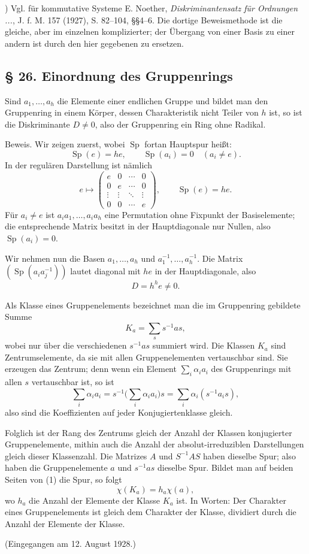 \documentclass[11pt]{article}
\begin{document}
{\footnotesize{}) Vgl. für kommutative Systeme E. Noether, \emph{Diskriminantensatz für Ordnungen ...}, J. f. M. 157 (1927), S. 82--104, §§4--6. Die dortige Beweismethode ist die gleiche, aber im einzelnen komplizierter; der Übergang von einer Basis zu einer andern ist durch den hier gegebenen zu ersetzen.\par}

\subsection*{§ 26. Einordnung des Gruppenrings}
Sind $a_1,\ldots,a_h$ die Elemente einer endlichen Gruppe und bildet man den Gruppenring in einem Körper, dessen Charakteristik nicht Teiler von $h$ ist, so ist die Diskriminante $D\ne0$, also der Gruppenring ein Ring ohne Radikal.

Beweis. Wir zeigen zuerst, wobei $\operatorname{Sp}$ fortan Hauptspur heißt:
\[
        \operatorname{Sp}(e)=he,
        \qquad
        \operatorname{Sp}(a_i)=0\quad(a_i\ne e).
\]
In der regulären Darstellung ist nämlich
\[
        e\mapsto\begin{pmatrix}e&0&\cdots&0\\0&e&\cdots&0\\\vdots&\vdots&\ddots&\vdots\\0&0&\cdots&e\end{pmatrix},
        \qquad \operatorname{Sp}(e)=he.
\]
Für $a_i\ne e$ ist $a_i a_1,\ldots,a_i a_h$ eine Permutation ohne Fixpunkt der Basiselemente; die entsprechende Matrix besitzt in der Hauptdiagonale nur Nullen, also $\operatorname{Sp}(a_i)=0$.

Wir nehmen nun die Basen $a_1,\ldots,a_h$ und $a_1^{-1},\ldots,a_h^{-1}$. Die Matrix $(\operatorname{Sp}(a_i a_j^{-1}))$ lautet diagonal mit $he$ in der Hauptdiagonale, also
\[
        D=h^h e\ne0.
\]

Als Klasse eines Gruppenelements bezeichnet man die im Gruppenring gebildete Summe
\[
        K_a=\sum_s s^{-1}as,                         \tag{1}
\]
wobei nur über die verschiedenen $s^{-1}as$ summiert wird. Die Klassen $K_a$ sind Zentrumselemente, da sie mit allen Gruppenelementen vertauschbar sind. Sie erzeugen das Zentrum; denn wenn ein Element $\sum_i\alpha_i a_i$ des Gruppenrings mit allen $s$ vertauschbar ist, so ist
\[
        \sum_i\alpha_i a_i=s^{-1}\biggl(\sum_i\alpha_i a_i\biggr)s
        =\sum_i\alpha_i(s^{-1}a_i s),
\]
also sind die Koeffizienten auf jeder Konjugiertenklasse gleich.

Folglich ist der Rang des Zentrums gleich der Anzahl der Klassen konjugierter Gruppenelemente, mithin auch die Anzahl der absolut-irreduziblen Darstellungen gleich dieser Klassenzahl. Die Matrizes $A$ und $S^{-1}AS$ haben dieselbe Spur; also haben die Gruppenelemente $a$ und $s^{-1}as$ dieselbe Spur. Bildet man auf beiden Seiten von (1) die Spur, so folgt
\[
        \chi(K_a)=h_a\chi(a),
\]
wo $h_a$ die Anzahl der Elemente der Klasse $K_a$ ist. In Worten: Der Charakter eines Gruppenelements ist gleich dem Charakter der Klasse, dividiert durch die Anzahl der Elemente der Klasse.

\begin{center}
(Eingegangen am 12. August 1928.)
\end{center}
\end{document}
